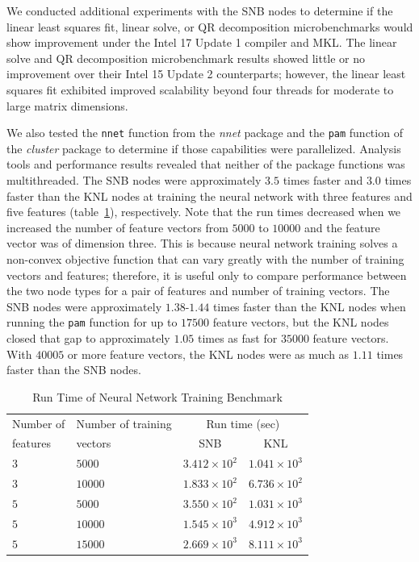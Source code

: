 We conducted additional experiments with the SNB nodes to determine if the linear least
squares fit, linear solve, or QR decomposition microbenchmarks would show improvement
under the Intel 17 Update 1 compiler and MKL. The linear solve and QR decomposition
microbenchmark results showed little or no improvement over their Intel 15 Update 2
counterparts; however, the linear least squares fit exhibited improved scalability beyond
four threads for moderate to large matrix dimensions.

We also tested the \texttt{nnet} function from the \textit{nnet} package and the
\texttt{pam} function of the \textit{cluster} package to determine if those capabilities
were parallelized.
Analysis tools and performance results revealed that neither of the package functions was
multithreaded.  The SNB nodes were approximately $3.5$
times faster and $3.0$ times faster than the KNL nodes at training the neural network with
three features and five features (table~\ref{tab:nnetResults}), respectively. Note that
the run times decreased when we increased the number of feature vectors from $5000$ to
$10000$ and the feature vector was of dimension three. This is because neural network
training solves a non-convex objective function that can vary greatly with the number of
training vectors and features; therefore, it is useful only to compare performance between
the two node types for a pair of features and number of training vectors. The SNB nodes
were approximately $1.38$-$1.44$ times faster than the KNL nodes when running the
\texttt{pam} function for up to $17500$ feature vectors, but the KNL nodes closed that gap
to approximately $1.05$ times as fast for $35000$ feature vectors. With $40005$ or more
feature vectors, the KNL nodes were as much as $1.11$ times faster than the SNB nodes.

\begin{table}
  \caption{Run Time of Neural Network Training Benchmark}
  \label{tab:nnetResults}
  \begin{tabular}{llcc}
    \toprule
      Number of & Number of training & \multicolumn{2}{c}{Run time (sec)}\\
      features  & vectors            & SNB & KNL\\
    \midrule
    $3$ & $5000$  & $3.412\times 10^{2}$ & $1.041\times 10^{3}$ \\
    $3$ & $10000$ & $1.833\times 10^{2}$ & $6.736\times 10^{2}$ \\
    $5$ & $5000$  & $3.550\times 10^{2}$ & $1.031\times 10^{3}$ \\
    $5$ & $10000$ & $1.545\times 10^{3}$ & $4.912\times 10^{3}$ \\
    $5$ & $15000$ & $2.669\times 10^{3}$ & $8.111\times 10^{3}$ \\
    \bottomrule
  \end{tabular}
\end{table}

